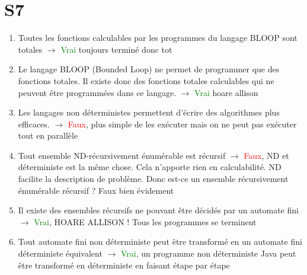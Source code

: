 \documentclass{report}
\begin{document}
\section{S7}
\begin{enumerate}
\item Toutes les fonctions calculables par les programmes du langage BLOOP sont totales $\rightarrow$ \textcolor{green}{Vrai} toujours terminé donc tot
\item Le langage BLOOP (Bounded Loop) ne permet de programmer que des fonctions totales.  Il existe donc des fonctions totales calculables qui ne peuvent être programmées dans ce langage. $\rightarrow$ \textcolor{green}{Vrai} hoare allison
\item Les langages non déterministes permettent d’écrire des algorithmes plus efficaces. $\rightarrow$ \textcolor{red}{Faux}, plus simple de les exécuter mais on ne peut pas exécuter tout en parallèle
\item Tout ensemble ND-récursivement énumérable  est récursif $\rightarrow$ \textcolor{red}{Faux}, ND et déterministe est la même chose. Cela n'apporte rien en calculabilité. ND facilite la description de problème. Donc est-ce un ensemble récursivement énumérable récursif ? Faux bien évidement
\item Il existe des ensembles récursifs ne pouvant être décidés par un automate fini $\rightarrow$ \textcolor{green}{Vrai}, HOARE ALLISON ! Tous les programmes se terminent 
\item Tout automate fini non déterministe peut être transformé en un automate fini déterministe équivalent $\rightarrow$ \textcolor{green}{Vrai}, un programme non déterministe Java peut être transformé en déterministe en faisant étape par étape
\end{enumerate}
\end{document}
